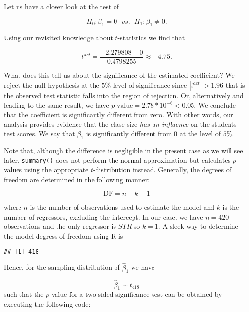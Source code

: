 \documentclass[]{book}
\newenvironment{Shaded}{\begin{snugshade}}{\end{snugshade}}
\newcommand{\CommentTok}[1]{\textcolor[rgb]{0.56,0.35,0.01}{\textit{#1}}}
\newcommand{\OperatorTok}[1]{\textcolor[rgb]{0.81,0.36,0.00}{\textbf{#1}}}
\newcommand{\NormalTok}[1]{#1}
\theoremstyle{definition}
\theoremstyle{definition}
\theoremstyle{definition}
\theoremstyle{remark}
\begin{document}
Let us have a closer look at the test of

\[H_0: \beta_1=0 \ \ \ vs. \ \ \ H_1: \beta_1 \neq 0.\]

Using our revisited knowledge about \(t\)-statistics we find that

\[ t^{act} = \frac{-2.279808 - 0}{0.4798255} \approx - 4.75. \]

What does this tell us about the significance of the estimated
coefficient? We reject the null hypothesis at the \(5\%\) level of
significance since \(|t^{act}| > 1.96\) that is the observed test
statistic falls into the region of rejection. Or, alternatively and
leading to the same result, we have
\(p\text{-value} = 2.78*10^{-6} < 0.05\). We conclude that the
coefficient is significantly different from zero. With other words, our
analysis provides evidence that the clase size \emph{has an influence}
on the students test scores. We say that \(\beta_1\) is significantly
different from \(0\) at the level of \(5\%\).

Note that, although the difference is negligible in the present case as
we will see later, \texttt{summary()} does not perform the normal
approximation but calculates \(p\)-values using the appropriate
\(t\)-distribution instead. Generally, the degrees of freedom are
determined in the following manner:

\[ \text{DF} = n - k - 1 \]

where \(n\) is the number of observations used to estimate the model and
\(k\) is the number of regressors, excluding the intercept. In our case,
we have \(n=420\) observations and the only regressor is \(STR\) so
\(k=1\). A sleek way to determine the model degress of freedom using R
is

\begin{Shaded}
\end{Shaded}

\begin{verbatim}
## [1] 418
\end{verbatim}

Hence, for the sampling distribution of \(\hat\beta_1\) we have

\[ \hat\beta_1 \sim t_{418}\] such that the \(p\)-value for a two-sided
significance test can be obtained by executing the following code:
\end{document}
